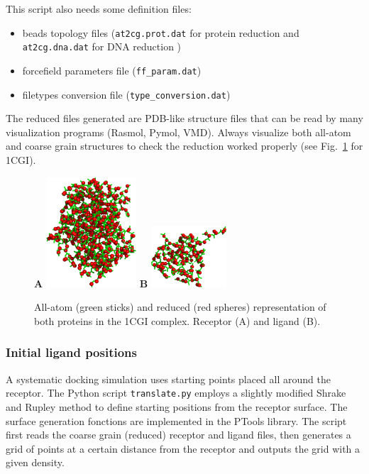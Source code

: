 \documentclass[12pt,a4paper]{article}
\begin{document}
This script also needs some definition files:

\begin{itemize}
\item beads topology files ({\tt at2cg.prot.dat} for protein reduction and {\tt at2cg.dna.dat} for DNA reduction )
\item forcefield parameters file ({\tt ff\_param.dat})
\item filetypes conversion file ({\tt type\_conversion.dat})
\end{itemize}

The reduced files generated are PDB-like structure files that can be read by many visualization programs (Rasmol, Pymol, VMD). Always visualize both all-atom and coarse grain structures to check the reduction worked properly (see Fig.~\ref{1CGI_at_cg} for 1CGI).

\begin{figure}[htbp]
\center
{\textbf A}
\includegraphics*[width=0.30\textwidth]{img/1CGI_receptor.png}
\hspace*{2cm}
{\textbf B}
\includegraphics*[width=0.25\textwidth]{img/1CGI_ligand.png}
\caption{All-atom (green sticks) and reduced (red spheres) representation of 
both proteins in the 1CGI complex. Receptor (A) and ligand (B).}
\label{1CGI_at_cg}
\end{figure}

\subsubsection{Initial ligand positions}

A systematic docking simulation uses starting points placed all around the
receptor.  The Python script {\tt translate.py} employs a slightly modified
Shrake and Rupley \cite{shrake1973} method to define starting positions
from the receptor surface.  The surface generation fonctions are implemented in
the PTools library. The script first reads the coarse grain (reduced)
receptor and ligand files, then generates a grid of points at a certain
distance from the receptor and outputs the grid with a given density.
\end{document}
